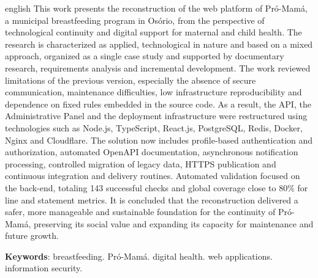 \begin{resumo}[Abstract]
 \begin{otherlanguage*}{english}
   This work presents the reconstruction of the web platform of Pró-Mamá, a municipal breastfeeding program in Osório, from the perspective of technological continuity and digital support for maternal and child health. The research is characterized as applied, technological in nature and based on a mixed approach, organized as a single case study and supported by documentary research, requirements analysis and incremental development. The work reviewed limitations of the previous version, especially the absence of secure communication, maintenance difficulties, low infrastructure reproducibility and dependence on fixed rules embedded in the source code. As a result, the API, the Administrative Panel and the deployment infrastructure were restructured using technologies such as Node.js, TypeScript, React.js, PostgreSQL, Redis, Docker, Nginx and Cloudflare. The solution now includes profile-based authentication and authorization, automated OpenAPI documentation, asynchronous notification processing, controlled migration of legacy data, HTTPS publication and continuous integration and delivery routines. Automated validation focused on the back-end, totaling 143 successful checks and global coverage close to 80\% for line and statement metrics. It is concluded that the reconstruction delivered a safer, more manageable and sustainable foundation for the continuity of Pró-Mamá, preserving its social value and expanding its capacity for maintenance and future growth.

   \vspace{\onelineskip}
 
   \noindent 
   \textbf{Keywords}: breastfeeding. Pró-Mamá. digital health. web applications. information security.
 \end{otherlanguage*}
\end{resumo}
